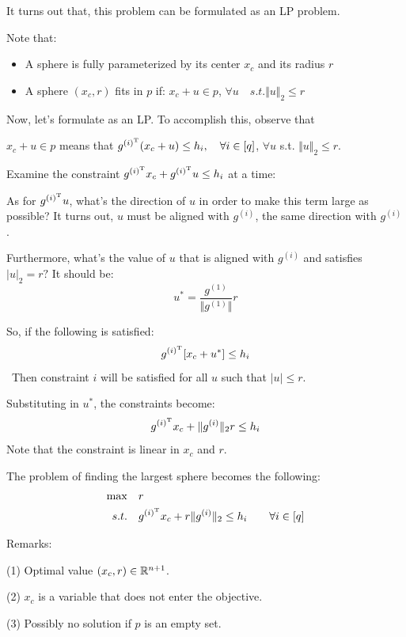It turns out that, this problem can be formulated as an LP problem. \

Note that:
\begin{itemize}
	\item A sphere is fully parameterized by its center $x_c$ and its radius $r$
	
	\item A sphere $(x_c, r)$ fits in $p$ if: $x_c + u \in p$, $\forall u \quad s.t. \Vert u\Vert _2\leq r$
\end{itemize}

\vspace{0.3cm}
Now, let's formulate as an LP. To accomplish this, observe that 

$x_c+u \in p$ means that $g^{(i)^{{\rm T}}}(x_c + u) \leq h_i,\quad \forall i\in [q]$, $\forall u$ s.t. $\Vert u\Vert _2\leq r$.

\vspace{0.2cm}
Examine the constraint $g^{({i})^{{\rm T}}}x_c + g^{({i})^{{\rm T}}}u \leq h_i$ at a time:

As for $g^{({i})^{{\rm T}}}u$, what's the direction of $u$ in order to make this term large as possible? It turns out, $u$ must be aligned with $g^{(i)}$, the same direction with $g^{(i)}$.

Furthermore, what's the value of $u$ that is aligned with $g^{(i)}$ and satisfies  $\vert u\vert_2=r?$ It should be:
$$u^*=\frac{g^{(1)}}{\Vert g^{(1)}\Vert }r$$


So, if the following is satisfied:
$$g^{(i)^{{\rm T}}}[x_c + u^*] \leq h_i$$\
Then constraint $i$ will be satisfied for all $u$ such that $\vert u\vert \leq r$.

Substituting in $u^*$, the constraints become:
$$g^{(i)^{{\rm T}}} x_c + \Vert g^{(i)}\Vert_2 r\leq h_i$$
Note that the constraint is linear in $x_c$ and $r$.

The problem of finding the largest sphere becomes the following:
\begin{align*}
	\max \quad & r\\
	s.t.\quad &g^{(i)^{{\rm T}}}x_c + r \Vert g^{(i)}\Vert _2\leq h_i \qquad \forall i\in [q]
\end{align*}


Remarks:

(1) Optimal value $(x_c, r)\in \mathbb{R}^{n+1}$.

(2) $x_c$ is a variable that does not enter the objective.

(3) Possibly no solution if $p$ is an empty set.

